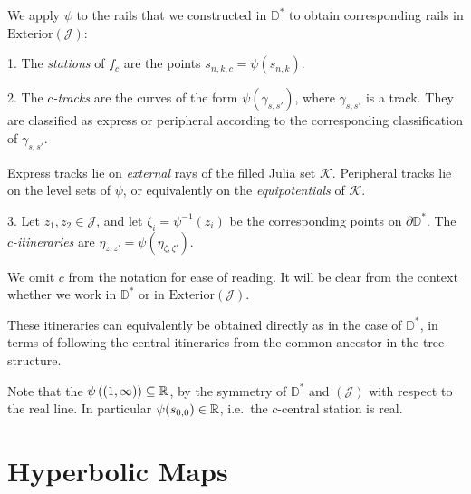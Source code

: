We apply $\psi$ to the rails that we constructed in $\mathbb D^*$ to obtain corresponding rails in $\mathrm{Exterior}(\mathcal{J})$:
\begin{definition}

1. The 	\emph{stations} of $f_c$ are the points  $s_{n,k,c}=\psi(s_{n,k})$.

2. The \emph{$c$-tracks} are the curves of the form $\psi \left(\gamma_{s,s'}\right)$, where $\gamma_{s,s'}$ is a track. They are classified as express or peripheral according to the corresponding classification of $\gamma_{s,s'}$. 

Express tracks lie on \emph{external} rays of the filled Julia set $\mathcal K$.
Peripheral tracks lie on the level sets of $\psi$, or equivalently on the \emph{equipotentials} of $\mathcal K$.

3. Let $z_1,z_2\in \mathcal J$, and let $\zeta_i=\psi^{-1}(z_i)$ be the corresponding points on $\partial \mathbb D^*$. 
The \emph{$c$-itineraries} are $\eta_{z,z'}=\psi(\eta_{\zeta,\zeta'})$.

We omit $c$ from the notation for ease of reading. It will be clear from the context whether we work in $\mathbb D^*$ or in $\mathrm{Exterior}(\mathcal J)$.

These itineraries can equivalently be obtained directly as in the case of $\mathbb D^*$, in terms of following the central itineraries from the common ancestor in the tree structure.
\end{definition}

Note that the $\psi\left((1,\infty)\right)\subseteq\mathbb{R}$, by the symmetry of $\mathbb D^*$ and $(\mathcal{J})$
with respect to the real line. In particular $\psi(s_{0,0})\in\mathbb{R}$, i.e.\ the $c$-central station is real.

\begin{comment}
\begin{proof}
Formally, $\overline{\psi}(\overline{z})$
	is another conformal conjugacy between $f$ and $f_0$ which fixes infinity, so by uniqueness of the Böttcher coordinate we obtain $\psi(z)=\overline{\psi}(\overline{z})$,
	hence $\psi(z)\in\R$ for $z\in\R$.
\end{proof}
\end{comment}

\section{Hyperbolic Maps}

